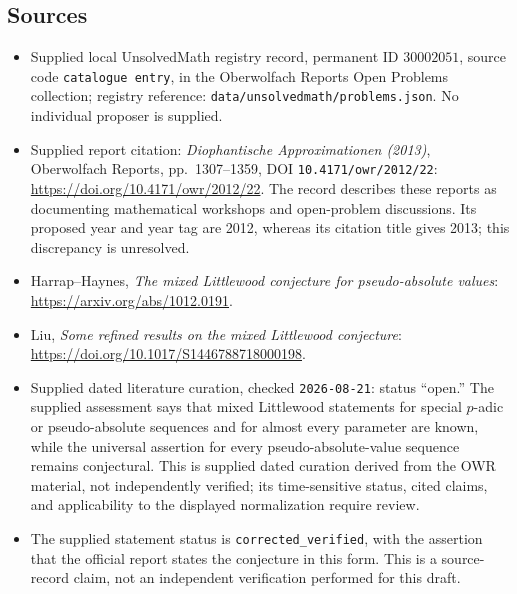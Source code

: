 \documentclass[11pt]{article}
\begin{document}
\subsection{Sources}
\begin{itemize}
\item Supplied local UnsolvedMath registry record, permanent ID \(30002051\), source code \texttt{catalogue entry}, in the Oberwolfach Reports Open Problems collection; registry reference: \texttt{data/unsolvedmath/problems.json}. No individual proposer is supplied.
\item Supplied report citation: \emph{Diophantische Approximationen (2013)}, Oberwolfach Reports, pp.~1307--1359, DOI \texttt{10.4171/owr/2012/22}: \url{https://doi.org/10.4171/owr/2012/22}. The record describes these reports as documenting mathematical workshops and open-problem discussions. Its proposed year and year tag are 2012, whereas its citation title gives 2013; this discrepancy is unresolved.
\item Harrap--Haynes, \emph{The mixed Littlewood conjecture for pseudo-absolute values}: \url{https://arxiv.org/abs/1012.0191}.
\item Liu, \emph{Some refined results on the mixed Littlewood conjecture}: \url{https://doi.org/10.1017/S1446788718000198}.
\item Supplied dated literature curation, checked \texttt{2026-08-21}: status ``open.'' The supplied assessment says that mixed Littlewood statements for special \(p\)-adic or pseudo-absolute sequences and for almost every parameter are known, while the universal assertion for every pseudo-absolute-value sequence remains conjectural. This is supplied dated curation derived from the OWR material, not independently verified; its time-sensitive status, cited claims, and applicability to the displayed normalization require review.
\item The supplied statement status is \texttt{corrected\_verified}, with the assertion that the official report states the conjecture in this form. This is a source-record claim, not an independent verification performed for this draft.
\end{itemize}
\end{document}

